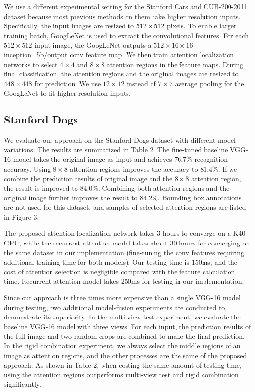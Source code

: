 \documentclass[10pt,twocolumn,letterpaper]{article}
\begin{document}
We use a different experimental  setting for the Stanford Cars and CUB-200-2011 dataset because most previous methods on them take higher resolution inputs.
Specifically, the input images are resized to $512\times512$ pixels.
To enable larger training batch, GoogLeNet \cite{bd7}  is used to extract the convolutional features.
For each $512\times512$ input image, the GoogLeNet outputs a $512\times16\times16$ inception\_5b/output conv feature map.
We then train attention localization networks to select $4\times4$ and $8\times8$ attention regions in the feature maps.
During final classification, the attention regions and the original images are resized to $448\times448$ for prediction.
We use $12\times12$ instead of $7\times7$ average pooling for the GoogLeNet to fit higher resolution inputs.

\subsection{Stanford Dogs}
We evaluate our approach on the Stanford Dogs dataset with different model variations.
The results are summarized in Table 2.
The fine-tuned baseline VGG-16 model takes the original image as input and achieves $76.7\%$ recognition accuracy.
Using $8\times8$ attention regions improves the accuracy to $81.4\%$.
If we combine the prediction results of original image and the $8\times8$ attention region, the result is improved to $84.0\%$.
Combining both attention regions and the original image further improves the result to $84.2\%$.
Bounding box annotations are not used for this dataset, and samples of selected attention regions are listed in Figure 3.

The proposed attention localization network takes 3 hours to converge on a K40 GPU, while the recurrent attention model \cite{bd3} takes about 30 hours for converging on the same dataset in our implementation (fine-tuning the conv features requiring additional training time for both models). Our testing time is 150ms, and the cost of attention selection is negligible compared with the feature calculation time. Recurrent attention model \cite{bd3} takes 250ms for testing in our implementation.

Since our approach is three times more expensive than a single VGG-16 model during testing, two additional model-fusion experiments are conducted to demonstrate its superiority.
In the multi-view test experiment, we evaluate the baseline VGG-16 model with three views.
For each input, the prediction results of the full image and two random crops are combined to make the final prediction.
In the rigid combination experiment, we always select the middle regions of an image as attention regions, and the other processes are the same of the proposed approach.
As shown in Table 2, when costing the same amount of testing time, using the attention regions outperforms multi-view test and rigid combination significantly.
\end{document}
